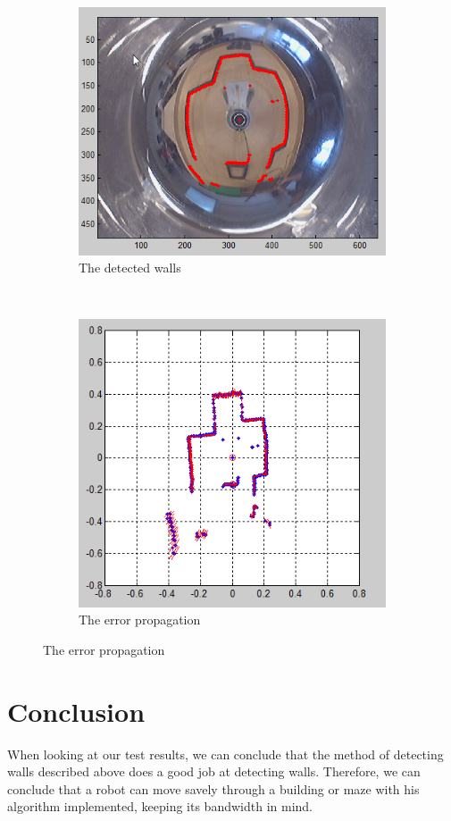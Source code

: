 \documentclass[12pt]{article}
\begin{document}
\begin{figure}[h!]
	\begin{subfigure}[b]{0.4\textwidth}
		\includegraphics[width=\textwidth]{wallsinimg.png}
		\caption{The detected walls}
	\end{subfigure}
	~
	\begin{subfigure}[b]{0.4\textwidth}
		\includegraphics[width=\textwidth]{error.png}
		\caption{The error propagation}
	\end{subfigure}
\end{figure}
\clearpage
\section{Conclusion}
When looking at our test results, we can conclude that the method of detecting walls described above does a good job at detecting walls. Therefore, we can conclude that a robot can move savely through a building or maze with his algorithm implemented, keeping its bandwidth in mind.
\end{document}
